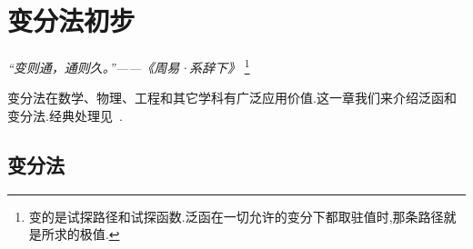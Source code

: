 \chapter{变分法初步}

\begin{flushright}
\textit{“变则通，通则久。”——《周易·系辞下》}
\footnote{变的是试探路径和试探函数.泛函在一切允许的变分下都取驻值时,那条路径就是所求的极值.}
\end{flushright}

变分法在数学、物理、工程和其它学科有广泛应用价值.这一章我们来介绍泛函和变分法.经典处理见~\cite{gelfand,goldstein,ivrii}.
\section{变分法}










% 
